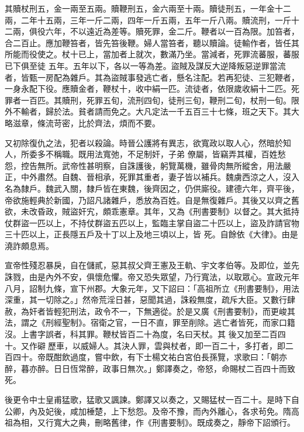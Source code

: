 \begin{pinyinscope}
 其贖杖刑五，金一兩至五兩。贖鞭刑五，金六兩至十兩。贖徒刑五，一年金十二兩，二年十五兩，三年一斤二兩，四年一斤五兩，五年一斤八兩。贖流刑，一斤十二兩，俱役六年，不以遠近為差等。贖死罪，金二斤。鞭者以一百為限。加笞者，合二百止。應加鞭笞者，皆先笞後鞭。婦人當笞者，聽以贖論。徒輸作者，皆任其所能而役使之。杖十已上，當加者上就次，數滿乃坐。當減者，死罪流蕃服，蕃服已下俱至徒
 五年。五年以下，各以一等為差。盜賊及謀反大逆降叛惡逆罪當流者，皆甄一房配為雜戶。其為盜賊事發逃亡者，懸名注配。若再犯徒、三犯鞭者，一身永配下役。應贖金者，鞭杖十，收中絹一匹。流徒者，依限歲收絹十二匹。死罪者一百匹。其贖刑，死罪五旬，流刑四旬，徒刑三旬，鞭刑二旬，杖刑一旬。限外不輸者，歸於法。貧者請而免之。大凡定法一千五百三十七條，班之天下。其大略滋章，條流苛密，比於齊法，煩而不要。



 又初除復仇之法，犯者以殺論。時晉公護將有異志，欲寬政以取人心，然暗於知人，所委多不稱職。既用法寬弛，不足制奸，子弟
 僚屬，皆竊弄其權，百姓愁怨，控告無所。武帝性甚明察，自誅護後，躬覽萬機，雖骨肉無所縱舍，用法嚴正，中外肅然。自魏、晉相承，死罪其重者，妻子皆以補兵。魏虜西涼之人，沒入名為隸戶。魏武入關，隸戶皆在東魏，後齊因之，仍供廝役。建德六年，齊平後，帝欲施輕典於新國，乃詔凡諸雜戶，悉放為百姓。自是無復雜戶。其後又以齊之舊欲，未改昏政，賊盜奸宄，頗乖憲章。其年，又為《刑書要制》以督之。其大抵持仗群盜一匹以上，不持仗群盜五匹以上，監臨主掌自盜二十匹以上，盜及詐請官物三十匹以上，正長隱五戶及十丁以上及地三頃以上，皆
 死。自餘依《大律》。由是澆詐頗息焉。



 宣帝性殘忍暴戾，自在儲貳，惡其叔父齊王憲及王軌、宇文孝伯等。及即位，並先誅戮，由是內外不安，俱懷危懼。帝又恐失眾望，乃行寬法，以取眾心。宣政元年八月，詔制九條，宣下州郡。大象元年，又下詔曰：「高祖所立《刑書要制》，用法深重，其一切除之。」然帝荒淫日甚，惡聞其過，誅殺無度，疏斥大臣。又數行肆赦，為奸者皆輕犯刑法，政令不一，下無適從。於是又廣《刑書要制》，而更峻其法，謂之《刑經聖制》。宿衛之官，一日不直，罪至削除。逃亡者皆死，而家口籍沒。上書字誤者，科其罪。鞭杖皆百二十為度，名曰天杖。其
 後又加至二百四十。又作礔歷車，以威婦人。其決人罪，雲與杖者，即一百二十，多打者，即二百四十。帝既酣飲過度，嘗中飲，有下士楊文祐白宮伯長孫覽，求歌曰：「朝亦醉，暮亦醉。日日恆常醉，政事日無次。」鄭譯奏之，帝怒，命賜杖二百四十而致死。



 後更令中士皇甫猛歌，猛歌又諷諫。鄭譯又以奏之，又賜猛杖一百二十。是時下自公卿，內及妃後，咸加棰楚，上下愁怨。及帝不豫，而內外離心，各求茍免。隋高祖為相，又行寬大之典，刪略舊律，作《刑書要制》。既成奏之，靜帝下詔頒行。




\end{pinyinscope}
